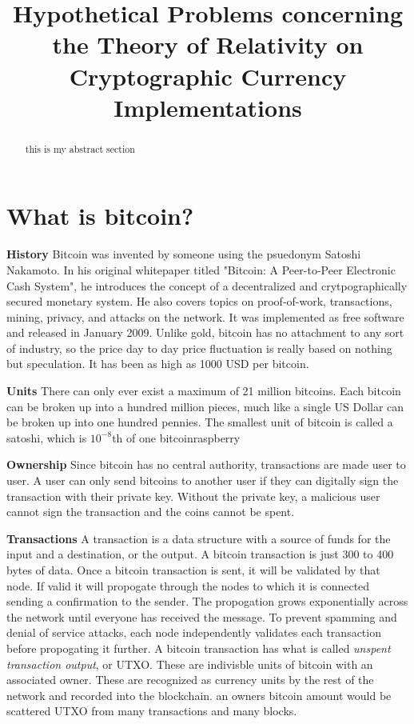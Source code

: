 \documentclass[conference]{IEEEtran}
\begin{document}
\title{Hypothetical Problems concerning the Theory of Relativity on Cryptographic Currency Implementations}
\author
{
}
\maketitle

\begin{abstract}
this is my abstract section
\end{abstract}

\section{What is bitcoin?}
\textbf{History} Bitcoin was invented by someone using the psuedonym Satoshi Nakamoto. In his original whitepaper titled "Bitcoin: A Peer-to-Peer Electronic Cash System", he introduces the concept of a decentralized and crytpographically secured monetary system. He also covers topics on proof-of-work, transactions, mining, privacy, and attacks on the network.\cite{nakamoto} It was implemented as free software and released in January 2009. Unlike gold, bitcoin has no attachment to any sort of industry, so the price day to day price fluctuation is really based on nothing but speculation. It has been as high as 1000 USD per bitcoin.\cite{1000usd}

\textbf{Units} There can only ever exist a maximum of 21 million bitcoins. Each bitcoin can be broken up into a hundred million pieces, much like a single US Dollar can be broken up into one hundred pennies. The smallest unit of bitcoin is called a satoshi, which is $10^{-8}$th of one bitcoinraspberry

\textbf{Ownership} Since bitcoin has no central authority, transactions are made user to user. A user can only send bitcoins to another user if they can digitally sign the transaction with their private key. Without the private key, a malicious user cannot sign the transaction and the coins cannot be spent. 

\textbf{Transactions} A transaction is a data structure with a source of funds for the input and a destination, or the output. A bitcoin transaction is just 300 to 400 bytes of data. Once a bitcoin transaction is sent, it will be validated by that node. If valid it will propogate through the nodes to which it is connected sending a confirmation to the sender. The propogation grows exponentially across the network until everyone has received the message. To prevent spamming and denial of service attacks, each node independently validates each transaction before propogating it further. A bitcoin transaction has what is called \textit{unspent transaction output}, or UTXO. These are indivisble units of bitcoin with an associated owner. These are recognized as currency units by the rest of the network and recorded into the blockchain. an owners bitcoin amount would be scattered UTXO from many transactions and many blocks. 
\end{document}
